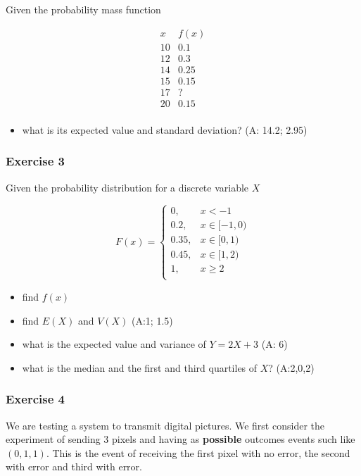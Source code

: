 \documentclass[
]{book}
\providecommand{\tightlist}{%
  \setlength{\itemsep}{0pt}\setlength{\parskip}{0pt}}
\begin{document}
Given the probability mass function

\[
\begin{array}{cc}
x & f(x) \\ 
10 & 0.1 \\ 
12 & 0.3 \\ 
14 & 0.25 \\ 
15 & 0.15 \\ 
17 & ? \\ 
20 & 0.15 \\ 
\end{array}
\]

\begin{itemize}
\tightlist
\item
  what is its expected value and standard deviation? (A: 14.2; 2.95)
\end{itemize}

\hypertarget{exercise-3-2}{%
\subsubsection{Exercise 3}\label{exercise-3-2}}

Given the probability distribution for a discrete variable \(X\)

\[
    F(x)= 
\begin{cases}
0, & x < -1 \\
0.2,& x \in [-1,0)\\
0.35,& x \in [0,1)\\
0.45,& x \in [1,2)\\
1,& x \geq 2\\
\end{cases}
\]

\begin{itemize}
\tightlist
\item
  find \(f(x)\)
\item
  find \(E(X)\) and \(V(X)\) (A:1; 1.5)
\item
  what is the expected value and variance of \(Y=2X+3\) (A: 6)
\item
  what is the median and the first and third quartiles of \(X\)? (A:2,0,2)
\end{itemize}

\hypertarget{exercise-4-2}{%
\subsubsection{Exercise 4}\label{exercise-4-2}}

We are testing a system to transmit digital pictures. We first consider the experiment of sending \(3\) pixels and having as \textbf{possible} outcomes events such like \((0,1,1)\). This is the event of receiving the first pixel with no error, the second with error and third with error.
\end{document}
